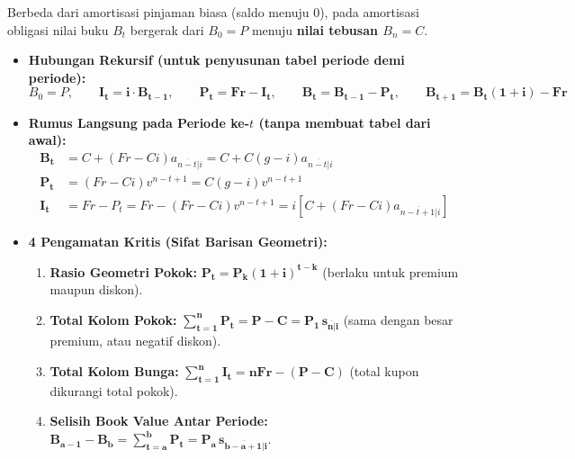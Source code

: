 \documentclass[10pt,a4paper]{article}
\newcommand{\angl}[1]{\overline{#1|}}
\begin{document}
\begin{rumusbox}
Berbeda dari amortisasi pinjaman biasa (saldo menuju $0$), pada amortisasi obligasi nilai buku $B_t$ bergerak dari $B_0 = P$ menuju \textbf{nilai tebusan $B_n = C$}.
\begin{itemize}[leftmargin=1.5em, topsep=1pt, itemsep=2pt]
    \item \textbf{Hubungan Rekursif (untuk penyusunan tabel periode demi periode):}
    \[
        B_0 = P, \qquad \mathbf{I_t = i \cdot B_{t-1}}, \qquad \mathbf{P_t = Fr - I_t}, \qquad \mathbf{B_t = B_{t-1} - P_t}, \qquad \mathbf{B_{t+1} = B_t(1+i) - Fr}
    \]
    \item \textbf{Rumus Langsung pada Periode ke-$t$ (tanpa membuat tabel dari awal):}
    \begin{align*}
        \mathbf{B_t} &= C + (Fr - Ci)a_{\angl{n-t}i} = C + C(g - i)a_{\angl{n-t}i} \\
        \mathbf{P_t} &= (Fr - Ci)v^{n-t+1} = C(g - i)v^{n-t+1} \\
        \mathbf{I_t} &= Fr - P_t = Fr - (Fr - Ci)v^{n-t+1} = i\left[C + (Fr - Ci)a_{\angl{n-t+1}i}\right]
    \end{align*}
    \item \textbf{4 Pengamatan Kritis (Sifat Barisan Geometri):}
    \begin{enumerate}[leftmargin=1.5em, topsep=0.5pt, itemsep=1pt]
        \item \textbf{Rasio Geometri Pokok:} $\mathbf{P_t = P_k (1 + i)^{t-k}}$ (berlaku untuk premium maupun diskon).
        \item \textbf{Total Kolom Pokok:} $\mathbf{\sum_{t=1}^n P_t = P - C = P_1 \, s_{\angl{n}i}}$ (sama dengan besar premium, atau negatif diskon).
        \item \textbf{Total Kolom Bunga:} $\mathbf{\sum_{t=1}^n I_t = nFr - (P - C)}$ (total kupon dikurangi total pokok).
        \item \textbf{Selisih Book Value Antar Periode:} $\mathbf{B_{a-1} - B_b = \sum_{t=a}^b P_t = P_a \, s_{\angl{b-a+1}i}}$.
    \end{enumerate}
\end{itemize}
\end{rumusbox}
\end{document}
